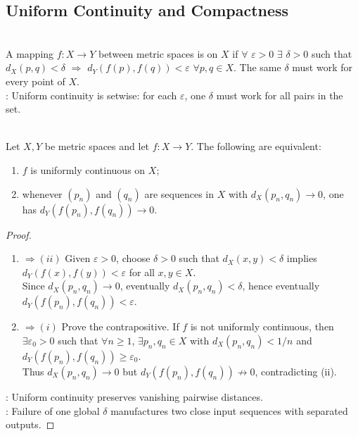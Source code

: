 \subsection{Uniform Continuity and Compactness}

\begin{definition} \label{def:uniform-continuity} \\
A mapping $f:X\to Y$ between metric spaces is  on $X$ if $\forall$ $\varepsilon>0$ $\exists$ $\delta>0$ such that $d_X(p,q)<\delta$ $\Longrightarrow$ $d_Y(f(p),f(q))<\varepsilon$ $\forall p,q\in X$. The same $\delta$ must work for every point of $X$.\\
: Uniform continuity is setwise: for each $\varepsilon$, one $\delta$ must work for all pairs in the set.
\end{definition}

\begin{proposition} \label{prop:uniform-continuity-sequential-test} \\
Let $X,Y$ be metric spaces and let $f:X\to Y$. The following are equivalent:
\begin{enumerate}[label=(\roman*)]
\setlength{\itemsep}{0pt}
\item $f$ is uniformly continuous on $X$;
\item whenever $(p_n)$ and $(q_n)$ are sequences in $X$ with $d_X(p_n,q_n)\to0$, one has $d_Y(f(p_n),f(q_n))\to0$.
\end{enumerate}
\begin{proof}
\begin{enumerate}[label=(\roman*).]
\setlength{\itemsep}{0pt}
\item[$(i)$]$\Rightarrow(ii)$ Given $\varepsilon>0$, choose $\delta>0$ such that $d_X(x,y)<\delta$ implies $d_Y(f(x),f(y))<\varepsilon$ for all $x,y\in X$.\\
Since $d_X(p_n,q_n)\to0$, eventually $d_X(p_n,q_n)<\delta$, hence eventually $d_Y(f(p_n),f(q_n))<\varepsilon$.
\item[$(ii)$]$\Rightarrow(i)$ Prove the contrapositive. If $f$ is not uniformly continuous, then $\exists \varepsilon_0>0$ such that $\forall n\geq1$, $\exists p_n,q_n\in X$ with $d_X(p_n,q_n)<1/n$ and $d_Y(f(p_n),f(q_n))\geq\varepsilon_0$.\\
Thus $d_X(p_n,q_n)\to0$ but $d_Y(f(p_n),f(q_n))\not\to0$, contradicting (ii).
\end{enumerate}
: Uniform continuity preserves vanishing pairwise distances.\\
: Failure of one global $\delta$ manufactures two close input sequences with separated outputs.
\end{proof}
\end{proposition}

